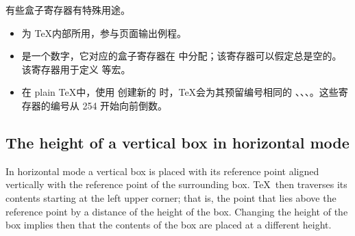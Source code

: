 \documentclass{book}
\begin{document}
有些盒子寄存器有特殊用途。
\begin{itemize}
\item {} 为 \TeX 内部所用，参与页面输出例程。
\item {} 是一个数字，它对应的盒子寄存器在  中分配；该寄存器可以假定总是空的。该寄存器用于定义  等宏。
\item 在 plain \TeX 中，使用  创建新的  时，\TeX 会为其预留编号相同的 、、、。这些寄存器的编号从 254 开始向前倒数。
\end{itemize}


\subsection{The height of a vertical box in horizontal mode}

In horizontal mode a vertical box is placed with its
reference point aligned vertically with the reference
point of the surrounding box.
\TeX\ then traverses its contents starting at the left
upper corner; that is, the point that lies above the reference
point by a distance of the height of the box.
Changing the height of the box  implies then that the
contents of the box are placed at a different height.
\end{document}
